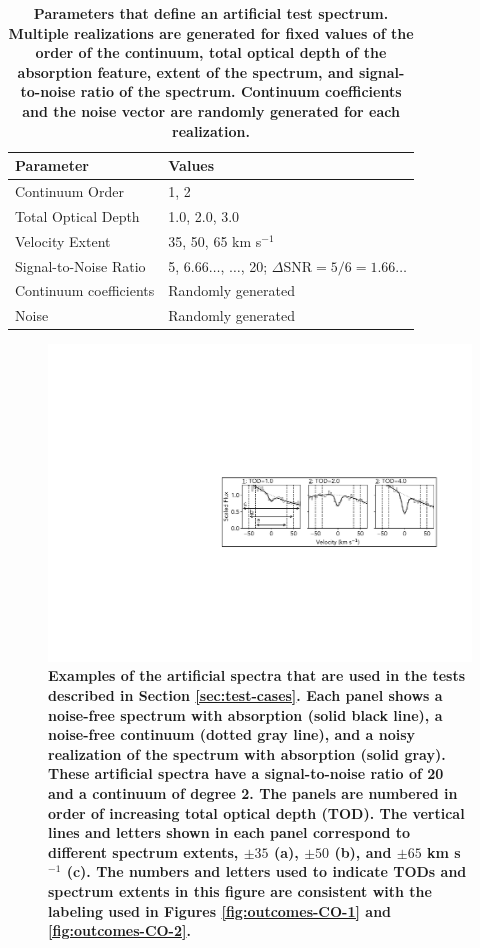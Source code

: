 \documentclass[trackchanges]{aastex62}
\begin{document}
\begin{table}
  \centering
\begin{tabular}{ll}
  {\bf Parameter} & {\bf Values} \\
  \hline
  Continuum Order & 1, 2 \\
  Total Optical Depth & 1.0, 2.0, 3.0 \\
  Velocity Extent & 35, 50, 65 km s$^{-1}$ \\
  Signal-to-Noise Ratio & 5, 6.66$\ldots$, $\ldots$, 20; $\Delta$SNR$=5/6=1.66\ldots$\\
  Continuum coefficients & Randomly generated \\
  Noise & Randomly generated
\end{tabular}
\caption{
{
\bf \color{red}
Parameters that define an artificial test spectrum.
Multiple realizations are generated for fixed values of the order of the continuum, total optical depth of the absorption feature, extent of the spectrum, and signal-to-noise ratio of the spectrum.
Continuum coefficients and the noise vector are randomly generated for each realization.
}
}
\label{tab:artificial-data:params}
\end{table}


\begin{figure}
  \includegraphics[width=\linewidth]{figures/annotated_example_data.pdf}
  \caption{
  \bf \color{red}
  Examples of the artificial spectra that are used in the tests described in Section \ref{sec:test-cases}.
  Each panel shows a noise-free spectrum with absorption (solid black line), a noise-free continuum (dotted gray line), and a noisy realization of the spectrum with absorption (solid gray).
  These artificial spectra have a signal-to-noise ratio of 20 and a continuum of degree 2.
  The panels are numbered in order of increasing total optical depth (TOD).
  The vertical lines and letters shown in each panel correspond to different spectrum extents, $\pm 35$ (a), $\pm 50$ (b), and $\pm 65$ km s$^{-1}$ (c).
  The numbers and letters used to indicate TODs and spectrum extents in this figure are consistent with the labeling used in Figures \ref{fig:outcomes-CO-1} and \ref{fig:outcomes-CO-2}.
  }
  \label{fig:artificial-data-eg}
\end{figure}
\end{document}
